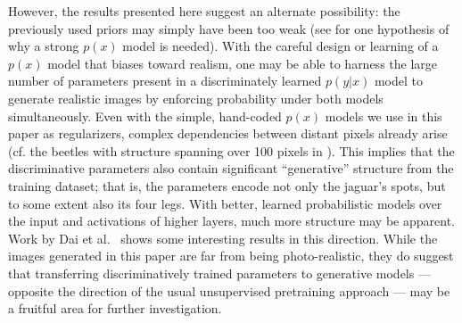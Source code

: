 \documentclass{article}
\begin{document}
However, the results presented here suggest an alternate possibility: the previously used priors may simply have been too weak (see  for one hypothesis of why a strong $p(x)$ model is needed). With the careful design or learning of a $p(x)$ model that biases toward realism,
one may be able to harness
the large number of parameters present in a discriminately learned $p(y|x)$ model
to generate realistic images by enforcing probability under both models simultaneously.
Even with the simple, hand-coded $p(x)$ models we use in this paper as regularizers, complex dependencies between distant pixels already arise (cf. the beetles with structure spanning over 100 pixels in ). This implies that the discriminative parameters also contain significant ``generative'' structure from the
training dataset; that is, the parameters encode
not only the jaguar's spots, but to some extent also its four legs.
With better, learned probabilistic models over the input and activations of higher layers, much more structure may be apparent. Work by Dai et al.~ shows some interesting results in this direction.
While the images generated in this paper are far from being photo-realistic, they do suggest that
transferring discriminatively trained parameters to generative models --- opposite the direction of the usual unsupervised pretraining approach --- may be a fruitful area for further investigation.


%
\end{document}
